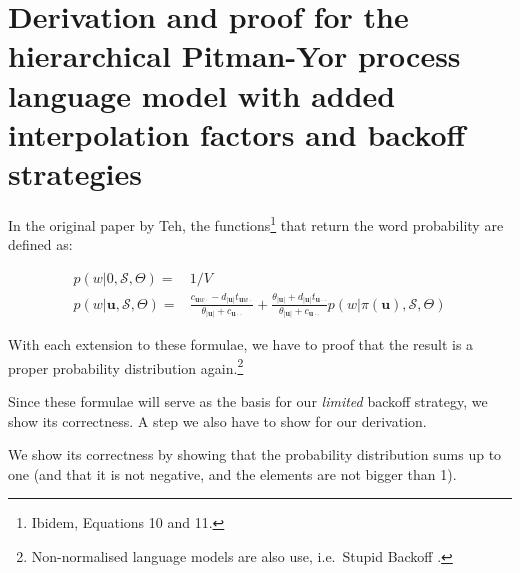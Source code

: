 \chapter{Derivation and proof for the hierarchical Pitman-Yor process language model with added interpolation factors and backoff strategies}\label{apx:proofinterpolform}

In the original paper by Teh,\autocite{teh2006hierarchical} the functions\footnote{Ibidem, Equations 10 and 11.} that return the word probability are defined as:

\begin{equation}
\begin{split}
p(w | 0, \mathcal{S}, \Theta) =& 1/V \\
p(w | \mathbf{u}, \mathcal{S}, \Theta) =& \frac{c_{\mathbf{u}w\cdot} - d_{|\mathbf{u}|}t_{\mathbf{u}w\cdot}}{\theta_{|\mathbf{u}|}+c_{\mathbf{u}\cdot\cdot}} + \frac{\theta_{|\mathbf{u}|} + d_{|\mathbf{u}|}t_{\mathbf{u}\cdot\cdot}}{\theta_{|\mathbf{u}|}+c_{\mathbf{u}\cdot\cdot}} p(w | \pi(\mathbf{u}), \mathcal{S}, \Theta)
\end{split}
\end{equation}

With each extension to these formulae, we have to proof that the result is a proper probability distribution again.\footnote{Non-normalised language models are also use, i.e.\ Stupid Backoff \autocite{brants2007large}.}

Since these formulae will serve as the basis for our \textsl{limited} backoff strategy, we show its correctness. A step we also have to show for our derivation.

We show its correctness by showing that the probability distribution sums up to one (and that it is not negative, and the elements are not bigger than 1).

